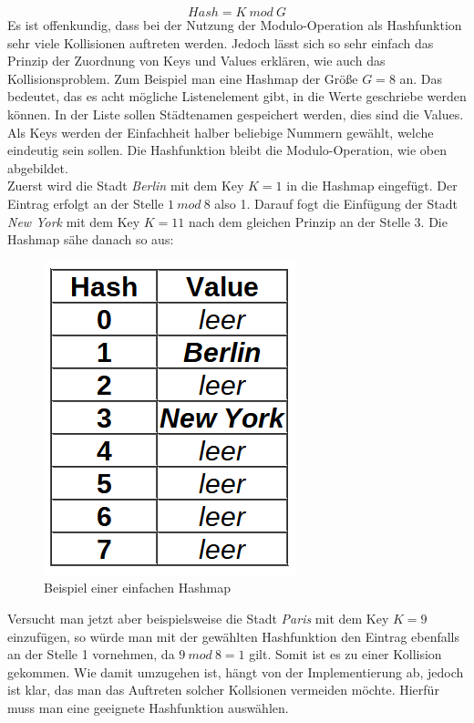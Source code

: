 \documentclass[11pt,a4paper]{article}
\begin{document}
$$Hash = K~ mod ~G$$
Es ist offenkundig, dass bei der Nutzung der Modulo-Operation als Hashfunktion sehr viele Kollisionen auftreten werden. Jedoch lässt sich so sehr einfach das Prinzip
der Zuordnung von Keys und Values erklären, wie auch das Kollisionsproblem.
Zum Beispiel man eine Hashmap der Größe $G = 8$ an. Das bedeutet, das es acht mögliche Listenelement gibt, in die Werte geschriebe werden können.
In der Liste sollen Städtenamen gespeichert werden, dies sind die Values. Als Keys werden der Einfachheit halber beliebige Nummern gewählt, welche eindeutig sein sollen.
Die Hashfunktion bleibt die Modulo-Operation, wie oben abgebildet.\\
Zuerst wird die Stadt \textit{Berlin} mit dem Key $K = 1$ in die Hashmap eingefügt. Der Eintrag erfolgt an der Stelle $1~ mod~ 8$ also 1.
Darauf fogt die Einfügung der Stadt \textit{New York} mit dem Key $K = 11$ nach dem gleichen Prinzip an der Stelle 3.
Die Hashmap sähe danach so aus:\\

\begin{figure}[h]
    \centering
    \includegraphics[scale=0.5]{Bilder/Hashmap_example_basic.PNG}
    \caption[Bild 1:]{Beispiel einer einfachen Hashmap}
     
\end{figure}

Versucht man jetzt aber beispielsweise die Stadt \textit{Paris} mit dem Key $K = 9$ einzufügen, so würde man mit der gewählten Hashfunktion den Eintrag ebenfalls an der Stelle 1
vornehmen, da $9~ mod~ 8 = 1$ gilt. Somit ist es zu einer Kollision gekommen. Wie damit umzugehen ist, hängt von der Implementierung ab, jedoch ist klar, das man das 
Auftreten solcher Kollsionen vermeiden möchte. Hierfür muss man eine geeignete Hashfunktion auswählen.
\end{document}
